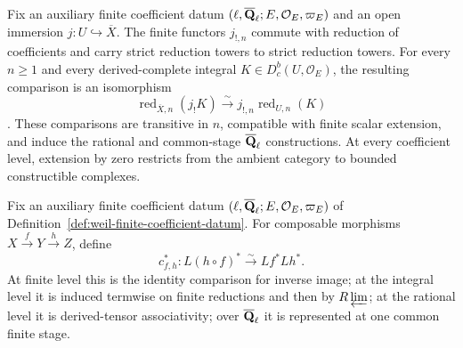 
\begin{proposition}
\label{prop:extension-by-zero-coefficient-passage}


Fix an auxiliary finite coefficient datum
\((\ell,\overline{\mathbf Q}_\ell;E,\mathcal O_E,\varpi_E)\) and an open immersion
\(j:U\hookrightarrow\overline X\).  The finite functors \(j_{!,n}\)
commute with reduction of coefficients and carry strict reduction towers
to strict reduction towers.  For every \(n\geq1\) and every
derived-complete integral \(K\in D^b_c(U,\mathcal O_E)\), the resulting
comparison is an isomorphism
\[
 \operatorname{red}_{\overline X,n}(j_!K)
 \xrightarrow{\sim}j_{!,n}\operatorname{red}_{U,n}(K)
\].
These comparisons are transitive in
\(n\), compatible with finite scalar extension, and induce the rational and
common-stage \(\overline{\mathbf Q}_\ell\) constructions.  At every coefficient level,
extension by zero restricts from the ambient category to bounded
constructible complexes.
\end{proposition}



\begin{definition}
\label{def:pullback-composition-comparison}


Fix an auxiliary finite coefficient datum
\((\ell,\overline{\mathbf Q}_\ell;E,\mathcal O_E,\varpi_E)\) of
Definition~\ref{def:weil-finite-coefficient-datum}.
For composable morphisms \(X\xrightarrow{f}Y\xrightarrow{h}Z\), define
\[
 c^*_{f,h}:L(h\circ f)^*\xrightarrow{\sim}Lf^*Lh^*.
\]
At finite level this is the identity comparison for inverse image; at the
integral level it is induced termwise on finite reductions and then by
\(R\varprojlim\); at the rational level it is derived-tensor associativity;
over \(\overline{\mathbf Q}_\ell\) it is represented at one common finite stage.
\end{definition}


